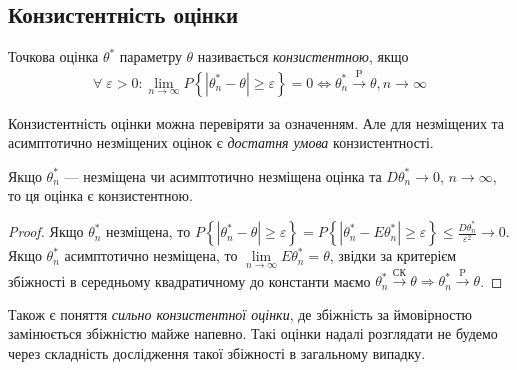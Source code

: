 \subsection{Конзистентність оцінки}
\begin{definition}
    Точкова оцінка $\theta^*$ параметру $\theta$ називається \emph{конзистентною}, якщо
    \begin{gather}\label{estim_consis}
        \forall \; \varepsilon > 0: \underset{n \to \infty}{\lim} P\left\{|\theta^*_n - \theta| \geq \varepsilon\right\}= 0
        \Leftrightarrow \theta^*_n \overset{\mathrm{P}}{\longrightarrow} \theta, n \to \infty
    \end{gather}
\end{definition}
Конзистентність оцінки можна перевіряти за означенням. Але для незміщених та асимптотично незміщених оцінок є
\emph{достатня умова} конзистентності.
\begin{proposition*}
    Якщо $\theta^*_n$ --- незміщена чи асимптотично незміщена оцінка та $D\theta^*_n \to 0$, $n \to \infty$,
    то ця оцінка є конзистентною.
\end{proposition*}
\begin{proof}
    Якщо $\theta^*_n$ незміщена, то 
    $P\left\{|\theta^*_n - \theta| \geq \varepsilon\right\}=P\left\{|\theta^*_n - E\theta^*_n| \geq \varepsilon\right\} 
    \leq \frac{D\theta^*_n}{\varepsilon^2} \to 0$.
    Якщо $\theta^*_n$ асимптотично незміщена, то $\underset{n\to\infty}{\lim} E\theta^*_n = \theta$,
    звідки за критерієм збіжності в середньому квадратичному до константи маємо 
    $\theta^*_n \overset{\text{СК}}{\longrightarrow} \theta \Rightarrow \theta^*_n \overset{\mathrm{P}}{\longrightarrow} \theta$.
\end{proof}
\begin{remark}
    Також є поняття \emph{сильно конзистентної оцінки}, де збіжність за ймовірностю замінюється збіжністю майже напевно.
    Такі оцінки надалі розглядати не будемо через складність дослідження такої збіжності в загальному випадку. 
\end{remark}
